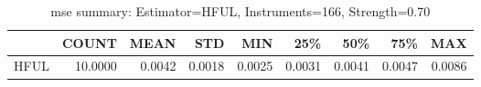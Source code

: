 \begin{table}[ht]
\centering
\caption{mse summary: Estimator=HFUL, Instruments=166, Strength=0.70}
\begin{tabular}{lrrrrrrrr}
\toprule
 & COUNT & MEAN & STD & MIN & 25\% & 50\% & 75\% & MAX \\
\midrule
HFUL & 10.0000 & 0.0042 & 0.0018 & 0.0025 & 0.0031 & 0.0041 & 0.0047 & 0.0086 \\
\bottomrule
\end{tabular}
\end{table}
